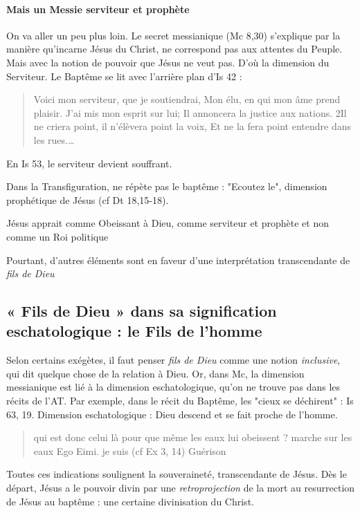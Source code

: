      \paragraph{Mais un Messie serviteur et prophète} On va aller un peu plus loin. Le secret messianique (Mc 8,30) s'explique par la manière qu'incarne Jésus du Christ, ne correspond pas aux attentes du Peuple. Mais avec la notion de pouvoir que Jésus ne veut pas. D'où la dimension du Serviteur.
     Le Baptême se lit avec l'arrière plan d'Is 42 : 
     \begin{quote}
         Voici mon serviteur, que je soutiendrai, Mon élu, en qui mon âme prend plaisir. J'ai mis mon esprit sur lui; Il annoncera la justice aux nations. 2Il ne criera point, il n'élèvera point la voix, Et ne la fera point entendre dans les rues.…
     \end{quote}
     En Is 53, le serviteur devient souffrant.
     
     Dans la Transfiguration,  ne répète pas le baptême : "Ecoutez le", dimension prophétique de Jésus (cf Dt 18,15-18).
     
     \begin{Synthesis}
     Jésus apprait comme Obeissant à Dieu, comme serviteur et prophète et non comme un Roi politique
     \end{Synthesis}
     Pourtant, d'autres éléments sont en faveur d'une interprétation transcendante de \textit{fils de Dieu}
     
    \subsection{« Fils de Dieu » dans sa signification eschatologique : le
    Fils de l'homme}
     Selon certains exégètes, il faut penser \textit{fils de Dieu} comme une notion \textit{inclusive}, qui dit quelque chose de la relation à Dieu. Or, dans Mc, la dimension messianique est lié à la dimension eschatologique, qu'on ne trouve pas dans les récits de l'AT. 
     Par exemple, dans le récit du Baptême, les "cieux se déchirent" : Is 63, 19. Dimension eschatologique : Dieu descend et se fait proche de l'homme. 
     
     \begin{quote}
         qui est donc celui là pour que même les eaux lui obeissent ?
         marche sur les eaux
         Ego Eimi. je suis (cf Ex 3, 14)
         Guérison
     \end{quote}
\begin{Synthesis}
    Toutes ces indications soulignent la souveraineté, transcendante de Jésus. Dès le départ, Jésus a le pouvoir divin par une \textit{retroprojection} de la mort au resurrection de Jésus au baptême : une certaine divinisation du Christ. 
\end{Synthesis}

